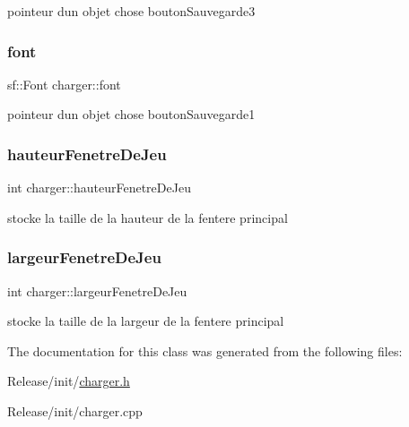 pointeur d\textquotesingle{}un objet chose bouton\+Sauvegarde3 \mbox{\label{classcharger_a170a19058e540e380bd17c9947fb0401}} 
\subsubsection{\texorpdfstring{font}{font}}
{\footnotesize\ttfamily sf\+::\+Font charger\+::font}

pointeur d\textquotesingle{}un objet chose bouton\+Sauvegarde1 \mbox{\label{classcharger_ae16952f21bfdfdf537575ef898993145}} 
\subsubsection{\texorpdfstring{hauteur\+Fenetre\+De\+Jeu}{hauteurFenetreDeJeu}}
{\footnotesize\ttfamily int charger\+::hauteur\+Fenetre\+De\+Jeu}

stocke la taille de la hauteur de la fentere principal \mbox{\label{classcharger_a9778bdc90d1404a3b1af81349fbd8c60}} 
\subsubsection{\texorpdfstring{largeur\+Fenetre\+De\+Jeu}{largeurFenetreDeJeu}}
{\footnotesize\ttfamily int charger\+::largeur\+Fenetre\+De\+Jeu}

stocke la taille de la largeur de la fentere principal 

The documentation for this class was generated from the following files\+:\begin{DoxyCompactItemize}
\item 
Release/init/\mbox{\hyperlink{charger_8h}{charger.\+h}}\item 
Release/init/charger.\+cpp\end{DoxyCompactItemize}
